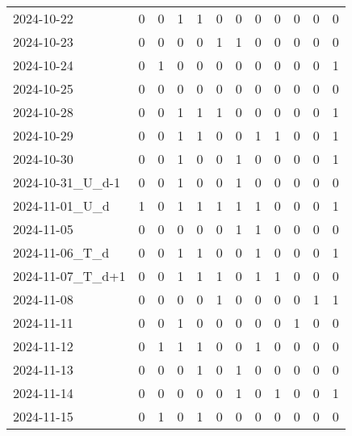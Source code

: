 \documentclass[dvipdfmx,oneside]{article}
\begin{document}
\begin{tabular}{lccccccccccc}
        2024-10-22 &     0 &     0 &     1 &     1 &     0 &     0 &     0 &     0 &     0 &     0 &     0 \\
        2024-10-23 &     0 &     0 &     0 &     0 &     1 &     1 &     0 &     0 &     0 &     0 &     0 \\
        2024-10-24 &     0 &     1 &     0 &     0 &     0 &     0 &     0 &     0 &     0 &     0 &     1 \\
        2024-10-25 &     0 &     0 &     0 &     0 &     0 &     0 &     0 &     0 &     0 &     0 &     0 \\
        2024-10-28 &     0 &     0 &     1 &     1 &     1 &     0 &     0 &     0 &     0 &     0 &     1 \\
        2024-10-29 &     0 &     0 &     1 &     1 &     0 &     0 &     1 &     1 &     0 &     0 &     1 \\
        2024-10-30 &     0 &     0 &     1 &     0 &     0 &     1 &     0 &     0 &     0 &     0 &     1 \\
2024-10-31\_U\_d-1 &     0 &     0 &     1 &     0 &     0 &     1 &     0 &     0 &     0 &     0 &     0 \\
  2024-11-01\_U\_d &     1 &     0 &     1 &     1 &     1 &     1 &     1 &     0 &     0 &     0 &     1 \\
        2024-11-05 &     0 &     0 &     0 &     0 &     0 &     1 &     1 &     0 &     0 &     0 &     0 \\
  2024-11-06\_T\_d &     0 &     0 &     1 &     1 &     0 &     0 &     1 &     0 &     0 &     0 &     1 \\
2024-11-07\_T\_d+1 &     0 &     0 &     1 &     1 &     1 &     0 &     1 &     1 &     0 &     0 &     0 \\
        2024-11-08 &     0 &     0 &     0 &     0 &     1 &     0 &     0 &     0 &     0 &     1 &     1 \\
        2024-11-11 &     0 &     0 &     1 &     0 &     0 &     0 &     0 &     0 &     1 &     0 &     0 \\
        2024-11-12 &     0 &     1 &     1 &     1 &     0 &     0 &     1 &     0 &     0 &     0 &     0 \\
        2024-11-13 &     0 &     0 &     0 &     1 &     0 &     1 &     0 &     0 &     0 &     0 &     0 \\
        2024-11-14 &     0 &     0 &     0 &     0 &     0 &     1 &     0 &     1 &     0 &     0 &     1 \\
        2024-11-15 &     0 &     1 &     0 &     1 &     0 &     0 &     0 &     0 &     0 &     0 &     0 \\

\end{tabular}
\end{document}
